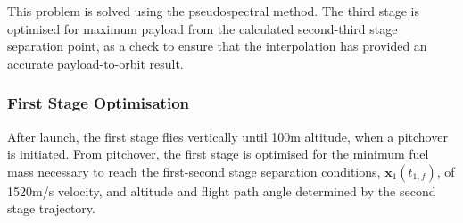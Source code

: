 \documentclass[journal]{new-aiaa}
\providecommand{\DIFadd}[1]{{\protect\color{blue}\uwave{#1}}} %
\providecommand{\DIFaddbegin}{} %
\providecommand{\DIFaddend}{} %
\newcommand{\DIFaddincludegraphics}[2][]{{\color{blue}\fbox{\DIFOincludegraphics[#1]{#2}}}} %
\DeclareRobustCommand{\DIFaddbegin}{\DIFOaddbegin \let\includegraphics\DIFaddincludegraphics} %
\DeclareRobustCommand{\DIFaddend}{\DIFOaddend \let\includegraphics\DIFOincludegraphics} %
\begin{document}
	 This problem is solved using the pseudospectral method\cite{Ross2004}.  \DIFaddbegin \DIFadd{\textcolor{red}{As with the constant dynamic pressure case, the number of nodes is manually varied between 96-105, and a solution computed for each node value, converging to similar local minima. The final solution chosen corresponds to the node value which most maximises the payload-to-orbit of the vehicle.} 
	 }\DIFaddend The third stage is optimised for maximum payload from the calculated second-third stage separation point, as a check to ensure that the interpolation has provided an accurate payload-to-orbit result. 

 

\subsubsection{First Stage Optimisation}
After launch, the first stage flies vertically until 100m altitude, when a pitchover is initiated. 
From pitchover, the first stage is optimised for the minimum fuel mass necessary to reach the first-second stage separation conditions, $\textbf{x}_1(t_{1,f})$, of 1520m/s velocity, and altitude and flight path angle determined by the second stage trajectory. 
\end{document}
